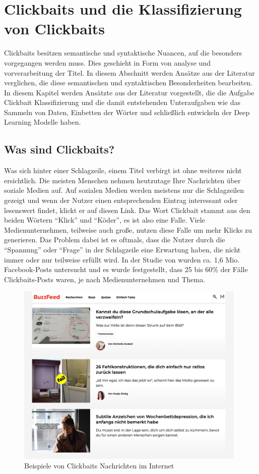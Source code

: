 
\chapter{Clickbaits und die Klassifizierung von Clickbaits}\label{ch4}


Clickbaits besitzen semantische und syntaktische Nuancen, auf die besonders vorgegangen werden muss. Dies geschieht in Form von analyse und vorverarbeitung der Titel. In diesem Abschnitt werden Ansätze aus der Literatur verglichen, die diese semantischen und syntaktischen Besonderheiten bearbeiten. In diesem Kapitel werden Ansätzte aus der Literatur vorgestellt, die die Aufgabe Clickbait Klassifizierung und die damit entstehenden Unteraufgaben wie das Sammeln von Daten, Einbetten der Wörter und schließlich entwickeln der Deep Learning Modelle haben.


\section{Was sind Clickbaits?}


Was sich hinter einer Schlagzeile, einem Titel verbirgt ist ohne weiteres nicht ersichtlich. Die meisten Menschen nehmen heutzutage Ihre Nachrichten über soziale Medien auf. Auf sozialen Medien werden meistens nur die Schlagzeilen gezeigt und wenn der Nutzer einen entsprechenden Eintrag interessant oder lesenswert findet, klickt er auf diesen Link. Das Wort Clickbait stammt aus den beiden Wörtern \enquote{Klick} und \enquote{Köder}, es ist also eine Falle. Viele Medienunternehmen, teilweise auch große, nutzen diese Falle um mehr Klicks zu generieren. Das Problem dabei ist es oftmals, dass die Nutzer durch die \enquote{Spannung} oder \enquote{Frage} in der Schlagzeile eine Erwartung haben, die nicht immer oder nur teilweise erfüllt wird. In der Studie von \cite*{Main} wurden ca. 1,6 Mio. Facebook-Posts untersucht und es wurde festgestellt, dass 25 bis 60\% der Fälle Clickbaits-Posts waren, je nach Medienunternehmen und Thema.

\begin{figure}[H]
    \centering
    \includegraphics[width=11cm]{kapitel4/buzz.png}
    \caption[Beispiele von Clickbaits]{Beispiele von Clickbaits Nachrichten im Internet}
    \label{clckbPic}
\end{figure}

